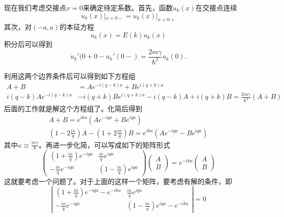 现在我们考虑交接点$x = 0$来确定待定系数。首先，函数$u_k(x)$在交接点连续
\begin{equation}
    u_k(x)|_{x=0-} = u_k(x)|_{x=0+}
\end{equation}
其次，对$(-a,a)$的本征方程
\begin{equation}
    [-\frac{\hbar^2}{2m} \frac{d^2}{dx^2} - \frac{i\hbar^2}{m}k \frac{d}{dx} + \frac{\hbar^2k^2}{2m} + \gamma \delta(x)] u_k(x) = E(k)u_k(x)
\end{equation}
积分后可以得到
\begin{equation}
    u_k'(0+0 -u_k'(0-) = \frac{2m\gamma}{\hbar^2}u_k(0).
\end{equation}
\par 利用这两个边界条件后可以得到如下方程组
\begin{align}
    A + B &= Ae^{-i(q-k)a} + Be^{i(q+k)a} \\
    i(q-k)Ae^{-i(q-k)a}&- i (q+k)Be^{i(q+k)a} - i(q-k)A + i(q+k)B = \frac{2m\gamma}{\hbar^2}(A+B)
\end{align}
后面的工作就是解这个方程组了。化简后得到
\begin{align}
    A + B = e^{ika}(A e^{-iqa} + Be^{iqa})  \\
    (1 - 2\frac{i\kappa}{q})A - (1+ 2\frac{i\kappa}{q}) B = e^{ika}(Ae^{-iqa} - Be^{iqa})
\end{align}
其中$\kappa \equiv \frac{m\gamma}{\hbar}$。再进一步化简，可以写成如下的矩阵形式
\begin{equation}
    \left(\begin{array}{cc}
        (1 + \frac{i\kappa}{q}) e^{-iqa} & \frac{i\kappa}{q}e^{iqa} \\
        -\frac{i\kappa}{q} e^{-iqa} & (1 - \frac{i\kappa}{q})e^{iqa}
    \end{array}\right)\left(\begin{array}{c}
         A  \\
         B 
    \end{array}\right) = e^{-ika}\left(\begin{array}{c}
         A  \\
         B 
    \end{array}\right)
\end{equation}
这就要考虑一个问题了。对于上面的这样一个矩阵，要考虑有解的条件，即
\begin{equation}
     \left|\begin{array}{cc}
        (1 + \frac{i\kappa}{q}) e^{-iqa}-e^{-ika} & \frac{i\kappa}{q}e^{iqa} \\
        -\frac{i\kappa}{q} e^{-iqa} & (1 - \frac{i\kappa}{q})e^{iqa}-e^{-ika}
    \end{array}\right| = 0
\end{equation}
